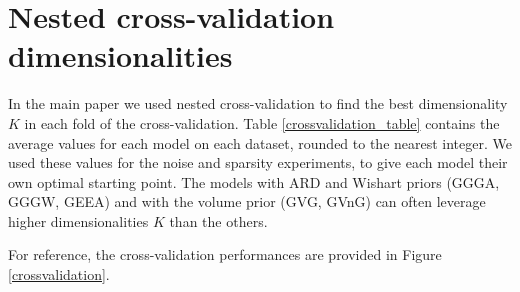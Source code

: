 \documentclass{article}
\begin{document}
		
	\clearpage
	\section{Nested cross-validation dimensionalities}
		In the main paper we used nested cross-validation to find the best dimensionality $K$ in each fold of the cross-validation. Table \ref{crossvalidation_table} contains the average values for each model on each dataset, rounded to the nearest integer. We used these values for the noise and sparsity experiments, to give each model their own optimal starting point. The models with ARD and Wishart priors (GGGA, GGGW, GEEA) and with the volume prior (GVG, GVnG) can often leverage higher dimensionalities $K$ than the others.
		
		For reference, the cross-validation performances are provided in Figure \ref{crossvalidation}.
		
\end{document}
